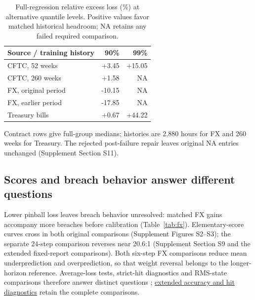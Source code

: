 \documentclass[11pt,a4paper]{article}
\begin{document}
\begin{table}[htbp]\centering\small
\caption{Full-regression relative excess loss (\%) at alternative quantile levels. Positive values favor matched historical headroom; NA retains any failed required comparison.}\label{tab:v12-tau}
\begin{tabular}{lrr}\toprule
Source / training history & 90\% & 99\% \\\midrule
CFTC, 52 weeks & +3.45 & +15.05 \\
CFTC, 260 weeks & +1.58 & \textsc{NA} \\
FX, original period & -10.15 & \textsc{NA} \\
FX, earlier period & -17.85 & \textsc{NA} \\
Treasury bills & +0.67 & +44.22 \\
\bottomrule\end{tabular}
\par\vspace{2pt}\begin{minipage}{.95\linewidth}\footnotesize
Contract rows give full-group medians; histories are 2,880 hours for FX and 260 weeks for Treasury.
The rejected post-failure repair leaves original NA entries unchanged (Supplement Section S11).
\end{minipage}\end{table}


\subsection{Scores and breach behavior answer different questions}

Lower pinball loss leaves breach behavior unresolved: matched FX gains accompany more breaches before calibration (Table~\ref{tab:fx}). Elementary-score curves cross in both original comparisons (Supplement Figures S2--S3); the separate 24-step comparison reverses near 20.6:1 (Supplement Section S9 and the extended fixed-report comparisons). Both six-step FX comparisons reduce mean underprediction and overprediction, so that weight reversal belongs to the longer-horizon reference. Average-loss tests, strict-hit diagnostics and RMS-state comparisons therefore answer distinct questions \citep{gw2006}; \href{https://github.com/ByronLi0207/financial-mathematics-paper-20261020/blob/submission-final/EXTENDED_RESULTS.md#asmbi-extended-s33}{extended accuracy and hit diagnostics} retain the complete comparisons.

\FloatBarrier
\end{document}
